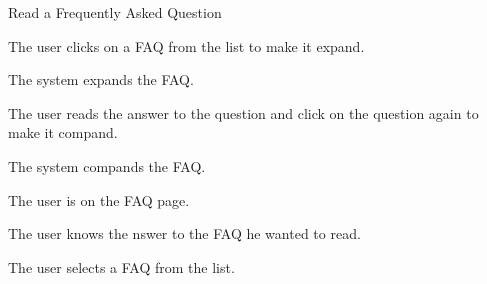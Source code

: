 
\begin{uc}{Read a Frequently Asked Question}

    \begin{uc-mss}
    \item The user clicks on a FAQ from the list to make it expand.
    \item The system expands the FAQ.
    \item The user reads the answer to the question and click on the question
        again to make it compand.
    \item The system compands the FAQ.
    \end{uc-mss}

    \begin{uc-pre}
    \item The user is on the FAQ page.
    \end{uc-pre}

    \begin{uc-post}
    \item The user knows the nswer to the FAQ he wanted to read.
    \end{uc-post}

    \begin{uc-trig}
        The user selects a FAQ from the list.
    \end{uc-trig}

\end{uc}
